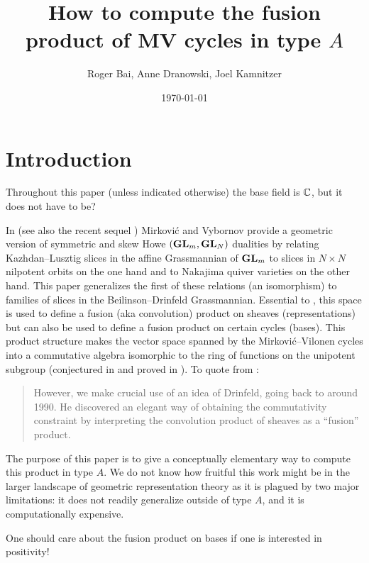\documentclass{article} %
\title{How to compute the fusion product of MV cycles in type $A$}
\author{Roger Bai, Anne Dranowski, Joel Kamnitzer}
\date{\today}
\begin{document}
\maketitle

\section{Introduction}
\label{s:intro}
% 
Throughout this paper (unless indicated otherwise) the base field is $\mathbb C$, but it does not have to be?  

In \cite{mirkovic2007quiver} (see also the recent sequel \cite{mirkovic2019comparison}) Mirkovi\'c and Vybornov provide a geometric version of symmetric and skew Howe $({\mathbf{GL}}_m,{\mathbf{GL}}_N)$ dualities by relating Kazhdan--Lusztig slices in the affine Grassmannian of ${\mathbf{GL}}_m$ to slices in $N\times N$ nilpotent orbits on the one hand 
and to Nakajima quiver varieties on the other hand. 
This paper generalizes the first of these relations (an isomorphism) to families of slices in the Beilinson--Drinfeld Grassmannian. 
Essential to \cite{mirkovic2007geometric}, this space is used to define a fusion (aka convolution) product on sheaves (representations) but can also be used to define a fusion product on certain cycles (bases). 
% 
This product structure makes the vector space spanned by the Mirkovi\'c--Vilonen cycles into a commutative algebra isomorphic to the ring of functions on the unipotent subgroup (conjectured in \cite{anderson2003polytope} and proved in \cite{baumann2019mirkovic}). %
% 
To quote from \cite{mirkovic2007geometric}:
\begin{quotation}
    However, we make crucial use of an idea of Drinfeld, going back to around 1990. He discovered an elegant way of obtaining the commutativity constraint by interpreting the convolution product of sheaves as a ``fusion'' product.
\end{quotation}
%
The purpose of this paper is to give a conceptually elementary way to compute this product in type $A$. We do not know how fruitful this work might be in the larger landscape of geometric representation theory as it is plagued by two major limitations: it does not readily generalize outside of type $A$, and it is computationally expensive. 
% 

One should care about the fusion product on bases      if one is interested in positivity!
\end{document}
